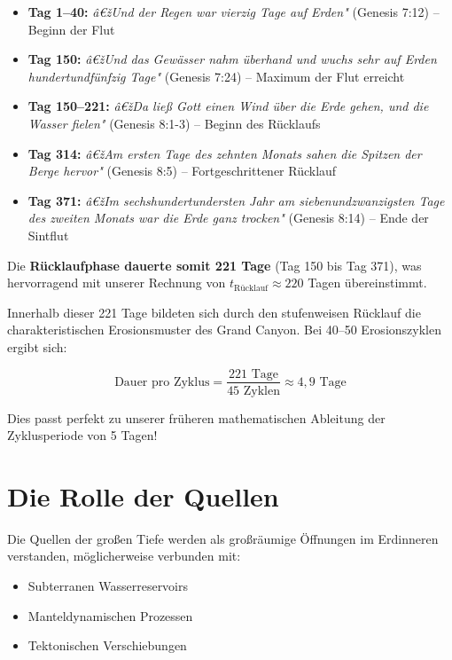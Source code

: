 ﻿\documentclass[12pt,a4paper]{report}
\begin{document}
\begin{itemize}
	\item \textbf{Tag 1--40:} \textit{â€žUnd der Regen war vierzig Tage auf Erden"} (Genesis 7:12) -- Beginn der Flut
	
	\item \textbf{Tag 150:} \textit{â€žUnd das Gewässer nahm überhand und wuchs sehr auf Erden hundertundfünfzig Tage"} (Genesis 7:24) -- Maximum der Flut erreicht
	
	\item \textbf{Tag 150--221:} \textit{â€žDa ließ Gott einen Wind über die Erde gehen, und die Wasser fielen"} (Genesis 8:1-3) -- Beginn des Rücklaufs
	
	\item \textbf{Tag 314:} \textit{â€žAm ersten Tage des zehnten Monats sahen die Spitzen der Berge hervor"} (Genesis 8:5) -- Fortgeschrittener Rücklauf
	
	\item \textbf{Tag 371:} \textit{â€žIm sechshundertundersten Jahr am siebenundzwanzigsten Tage des zweiten Monats war die Erde ganz trocken"} (Genesis 8:14) -- Ende der Sintflut
\end{itemize}

Die \textbf{Rücklaufphase dauerte somit 221 Tage} (Tag 150 bis Tag 371), was hervorragend mit unserer Rechnung von $t_{\text{Rücklauf}} \approx 220$ Tagen übereinstimmt.

Innerhalb dieser 221 Tage bildeten sich durch den stufenweisen Rücklauf die charakteristischen Erosionsmuster des Grand Canyon. Bei 40--50 Erosionszyklen ergibt sich:

\begin{equation}
	\text{Dauer pro Zyklus} = \frac{221 \text{ Tage}}{45 \text{ Zyklen}} \approx 4{,}9 \text{ Tage}
\end{equation}

Dies passt perfekt zu unserer früheren mathematischen Ableitung der Zyklusperiode von 5 Tagen!

\section{Die Rolle der Quellen}

Die Quellen der großen Tiefe werden als großräumige Öffnungen im Erdinneren verstanden, möglicherweise verbunden mit:

\begin{itemize}
	\item Subterranen Wasserreservoirs
	\item Manteldynamischen Prozessen
	\item Tektonischen Verschiebungen
\end{itemize}
\end{document}
